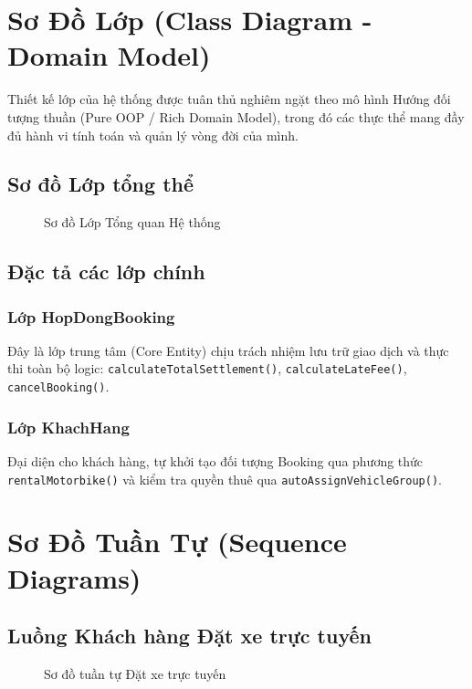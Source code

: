 \documentclass[12pt,a4paper]{report}
\begin{document}
\chapter{Sơ Đồ Lớp (Class Diagram - Domain Model)}

Thiết kế lớp của hệ thống được tuân thủ nghiêm ngặt theo mô hình Hướng đối tượng thuần (Pure OOP / Rich Domain Model), trong đó các thực thể mang đầy đủ hành vi tính toán và quản lý vòng đời của mình.

\section{Sơ đồ Lớp tổng thể}
\begin{figure}[H]
    \centering
    \fbox{\rule{0pt}{4in} \rule{1\linewidth}{0pt}} %
    \caption{Sơ đồ Lớp Tổng quan Hệ thống}
\end{figure}

\section{Đặc tả các lớp chính}
\subsection{Lớp HopDongBooking}
Đây là lớp trung tâm (Core Entity) chịu trách nhiệm lưu trữ giao dịch và thực thi toàn bộ logic: \texttt{calculateTotalSettlement()}, \texttt{calculateLateFee()}, \texttt{cancelBooking()}.

\subsection{Lớp KhachHang}
Đại diện cho khách hàng, tự khởi tạo đối tượng Booking qua phương thức \texttt{rentalMotorbike()} và kiểm tra quyền thuê qua \texttt{autoAssignVehicleGroup()}.


\chapter{Sơ Đồ Tuần Tự (Sequence Diagrams)}

\section{Luồng Khách hàng Đặt xe trực tuyến}
\begin{figure}[H]
    \centering
    \fbox{\rule{0pt}{4in} \rule{0.95\linewidth}{0pt}} %
    \caption{Sơ đồ tuần tự Đặt xe trực tuyến}
\end{figure}
\end{document}
